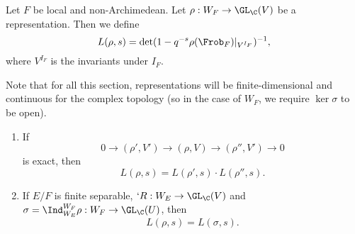 \documentclass[a4paper]{article}
\begin{document}
\begin{defi}
  Let $F$ be local and non-Archimedean. Let $\rho: W_F \to \GL_\C(V)$ be a representation. Then we define
  \[
    L(\rho, s) = \det (1 - q^{-s} \rho(\Frob_F)|_{V^{I_F}})^{-1},
  \]
  where $V^{I_F}$ is the invariants under $I_F$.
\end{defi}
Note that for all this section, representations will be finite-dimensional and continuous for the complex topology (so in the case of $W_F$, we require $\ker \sigma$ to be open).

\begin{prop}\leavevmode
  \begin{enumerate}
    \item If
      \[
        0 \to (\rho', V') \to (\rho, V) \to (\rho'', V') \to 0
      \]
      is exact, then
      \[
        L(\rho, s) = L(\rho', s) \cdot L(\rho'', s).
      \]
    \item If $E/F$ is finite separable, $`R: W_E \to \GL_\C(V)$ and $\sigma = \Ind_{W_E}^{W_F} \rho : W_F \to \GL_\C(U)$, then
      \[
        L(\rho, s) = L(\sigma, s).
      \]
  \end{enumerate}
\end{prop}
\end{document}
